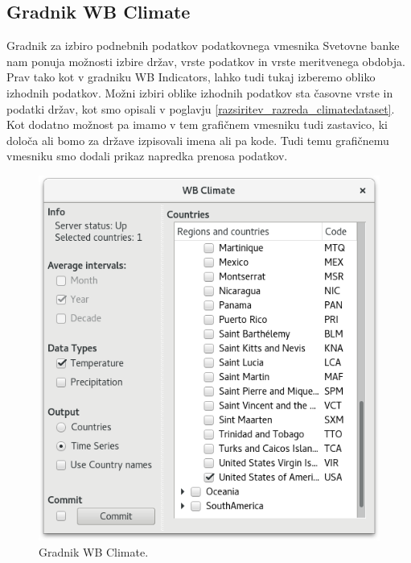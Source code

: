 \subsection{Gradnik WB Climate}

Gradnik za izbiro podnebnih podatkov podatkovnega vmesnika Svetovne banke nam
ponuja možnosti izbire držav, vrste podatkov in vrste meritvenega obdobja.
Prav tako kot v gradniku WB Indicators, lahko tudi tukaj izberemo obliko izhodnih
podatkov. Možni izbiri oblike izhodnih podatkov sta časovne vrste in podatki
držav, kot smo opisali v poglavju \ref{razsiritev_razreda_climatedataset}. 
Kot dodatno možnost pa imamo v tem grafičnem vmesniku tudi zastavico, ki 
določa ali bomo za države izpisovali imena ali pa kode. Tudi temu grafičnemu
vmesniku smo dodali prikaz napredka prenosa podatkov.



\begin{figure}
\begin{center}
\includegraphics[width=12cm]{pic/co2_temp_climate_selection.png}
\end{center}
\caption{Gradnik WB Climate.}
\label{co2_temp_climate}
\end{figure} 
